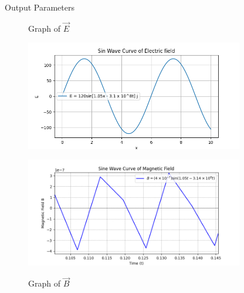 \documentclass[journal,12pt,twocolumn]{IEEEtran}
\theoremstyle{remark}
\begin{document}
\bigskip

\begin{center}
    \begin{table}[ht]
        \caption{Output Parameters}
        
        \label{tab:table3.12.8.8}
    \end{table}
\end{center}

\newpage

\renewcommand{\thefigure}{\theenumi}
\renewcommand{\thetable}{\theenumi}

\begin{flushleft}

\begin{figure}[ht]
\renewcommand\thefigure{1}
  \caption{Graph of $\vec{E}$}
  \includegraphics[width=0.85\textwidth]{figs/fig1.png}
  \label{fig:fig1.12.8.8}

    \renewcommand\thefigure{2}
    \caption{Graph of $\vec{B}$}
    \includegraphics[width=0.85\textwidth]{figs/fig2.png}
    \label{fig:fig2.12.8.8}
\end{figure}

\end{flushleft}
\end{document}
